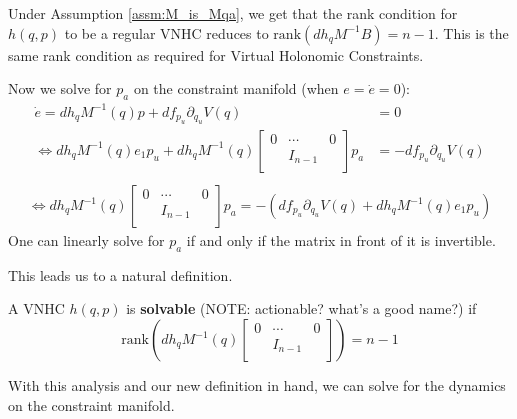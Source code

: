 Under Assumption \ref{assm:M_is_Mqa}, we get that the rank condition for \(h(q,p)\) to be a regular VNHC reduces to \(\text{rank}\left(dh_q M^{-1} B\right) = n - 1\). This is the same rank condition as required for Virtual Holonomic Constraints.

Now we solve for \(p_a\) on the constraint manifold (when \(e = \dot{e} = 0\)):
\begin{align*}
    \dot{e} = dh_q M^{-1}(q)p + df_{p_u} \partial_{q_u}V(q) &= 0\\
    \Leftrightarrow dh_q M^{-1}(q)e_1 p_u + dh_q M^{-1}(q) \begin{bmatrix}
    0 & \cdots & 0 \\
    & I_{n-1} & \\
    \end{bmatrix} p_a &= -df_{p_u} \partial_{q_u}V(q) \\
\end{align*}
\begin{align*}
    \Leftrightarrow dh_q M^{-1}(q) \begin{bmatrix}
    0 & \cdots & 0 \\
    & I_{n-1} & \\
    \end{bmatrix} p_a = -\left(df_{p_u}\partial_{q_u}V(q) + dh_q M^{-1}(q)e_1 p_u\right)
\end{align*}
One can linearly solve for \(p_a\) if and only if the matrix in front of it is invertible.

This leads us to a natural definition.
\begin{defn}\label{defn:solvability}
A VNHC \(h(q,p)\) is \textbf{solvable} (NOTE: actionable? what's a good name?) if
\[
\text{rank}\left(dh_q M^{-1}(q) \begin{bmatrix}
    0 & \cdots & 0 \\
    & I_{n-1} & \\
    \end{bmatrix}\right) = n - 1
\]
\end{defn}

With this analysis and our new definition in hand, we can solve for the dynamics on the constraint manifold.

